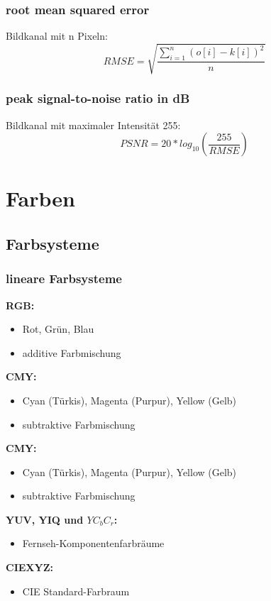 \documentclass[10pt]{article}
\begin{document}
\subsubsection*{root mean squared error}
Bildkanal mit n Pixeln:
\begin{equation*}
	RMSE = \sqrt{\frac{\sum_{i=1}^n (o[i]-k[i])^2}{n}}
\end{equation*}
\subsubsection*{peak signal-to-noise ratio in dB}
Bildkanal mit maximaler Intensität 255:
\begin{equation*}
	PSNR = 20 * log_{10} \left( \frac{255}{RMSE} \right)
\end{equation*}

\pagebreak
\section{Farben}

\subsection{Farbsysteme}
\subsubsection{lineare Farbsysteme}
\textbf{RGB:}
\begin{itemize}
	\item Rot, Grün, Blau
	\item additive Farbmischung
\end{itemize}
\textbf{CMY:}
\begin{itemize}
	\item Cyan (Türkis), Magenta (Purpur), Yellow (Gelb)
	\item subtraktive Farbmischung
\end{itemize}
\textbf{CMY:}
\begin{itemize}
	\item Cyan (Türkis), Magenta (Purpur), Yellow (Gelb)
	\item subtraktive Farbmischung
\end{itemize}
\textbf{YUV, YIQ und $YC_bC_r$:}
\begin{itemize}
	\item Fernseh-Komponentenfarbräume
\end{itemize}
\textbf{CIEXYZ:}
\begin{itemize}
	\item CIE Standard-Farbraum
\end{itemize}
\end{document}
